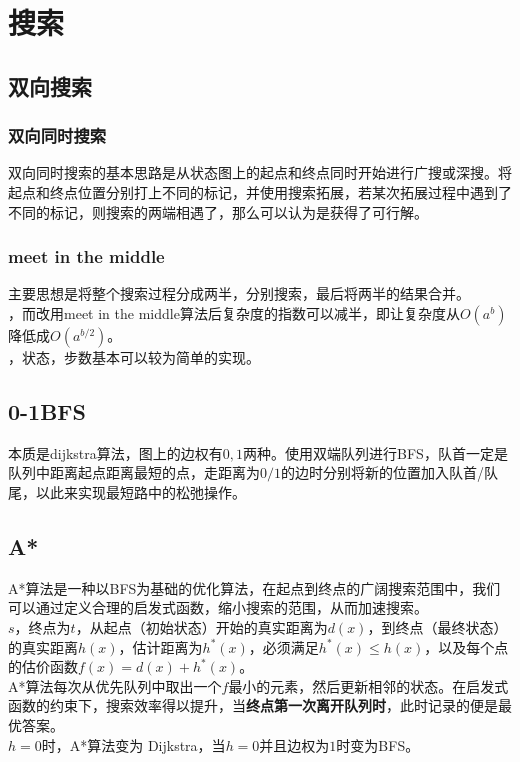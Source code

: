 \documentclass[a4paper]{book}
\begin{document}
\section{搜索}
\subsection{双向搜索}
\subsubsection{双向同时搜索}
双向同时搜索的基本思路是从状态图上的起点和终点同时开始进行广搜或深搜。将起点和终点位置分别打上不同的标记，并使用搜索拓展，若某次拓展过程中遇到了不同的标记，则搜索的两端相遇了，那么可以认为是获得了可行解。
\subsubsection{meet in the middle}
主要思想是将整个搜索过程分成两半，分别搜索，最后将两半的结果合并。\\
，而改用meet in the middle算法后复杂度的指数可以减半，即让复杂度从$O(a^b)$降低成$O(a^{b/2})$。\\
，状态，步数基本可以较为简单的实现。
\subsection{0-1BFS}
本质是dijkstra算法，图上的边权有$0,1$两种。使用双端队列进行BFS，队首一定是队列中距离起点距离最短的点，走距离为$0/1$的边时分别将新的位置加入队首/队尾，以此来实现最短路中的松弛操作。
\subsection{A*}
A*算法是一种以BFS为基础的优化算法，在起点到终点的广阔搜索范围中，我们可以通过定义合理的启发式函数，缩小搜索的范围，从而加速搜索。\\
$s$，终点为$t$，从起点（初始状态）开始的真实距离为$d(x)$，到终点（最终状态）的真实距离$h(x)$，估计距离为$h^{*}(x)$，必须满足$h^{*}(x)\leq h(x)$，以及每个点的估价函数$f(x)=d(x)+h^{*}(x)$。\\
\indent A*算法每次从优先队列中取出一个$f$最小的元素，然后更新相邻的状态。在启发式函数的约束下，搜索效率得以提升，当\textbf{终点第一次离开队列时}，此时记录的便是最优答案。\\
$h=0$时，A*算法变为 Dijkstra，当$h=0$并且边权为$1$时变为BFS。
\end{document}
